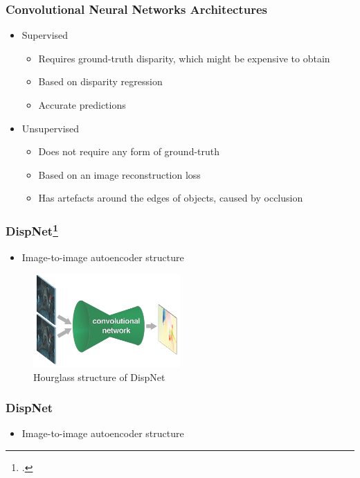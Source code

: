 \documentclass{beamer}
\begin{document}
\begin{frame}
\frametitle{Convolutional Neural Networks Architectures}
\center
\begin{itemize}
	\item Supervised
		\begin{itemize}
			\item Requires ground-truth disparity, which might be expensive to obtain
			\item Based on disparity regression
			\item Accurate predictions
		\end{itemize}
	\item Unsupervised
		\begin{itemize}
			\item Does not require any form of ground-truth
			\item Based on an image reconstruction loss
			\item Has artefacts around the edges of objects, caused by occlusion
		\end{itemize}
\end{itemize}
\end{frame}

\begin{frame}
\frametitle{DispNet\footcite{DBLP:journals/corr/FischerDIHHGSCB15}}
\center
\begin{itemize}
	\item Image-to-image autoencoder structure
\end{itemize}
\begin{figure}
    \centering
        \includegraphics[width=0.5\textwidth]{hourglass.png}
        \caption{Hourglass structure of DispNet}
    \end{figure}
\end{frame}

\begin{frame}
\frametitle{DispNet}
\center
\begin{itemize}
	\item Image-to-image autoencoder structure
\end{itemize}
\end{frame}
\end{document}

